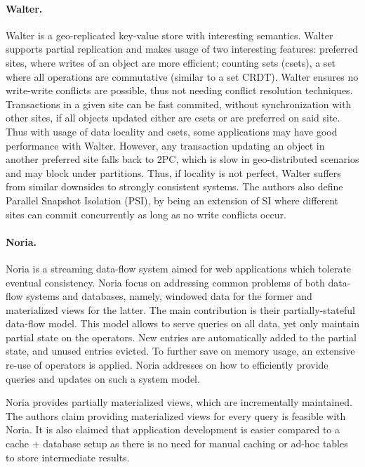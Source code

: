 \paragraph{Walter.} Walter \cite{walter} is a geo-replicated key-value store with interesting semantics.
Walter supports partial replication and makes usage of two interesting features: preferred sites, where writes of an object are more efficient; counting sets (csets), a set where all operations are commutative (similar to a set CRDT).
Walter ensures no write-write conflicts are possible, thus not needing conflict resolution techniques.
Transactions in a given site can be fast commited, without synchronization with other sites, if all objects updated either are csets or are preferred on said site.
Thus with usage of data locality and csets, some applications may have good performance with Walter.
However, any transaction updating an object in another preferred site falls back to 2PC, which is slow in geo-distributed scenarios and may block under partitions.
Thus, if locality is not perfect, Walter suffers from similar downsides to strongly consistent systems.
The authors also define Parallel Snapshot Isolation (PSI), by being an extension of SI where different sites can commit concurrently as long as no write conflicts occur.

\paragraph{Noria.} Noria \cite{noria} is a streaming data-flow system aimed for web applications which tolerate eventual consistency.
Noria focus on addressing common problems of both data-flow systems and databases, namely, windowed data for the former and materialized views for the latter.
The main contribution is their partially-stateful data-flow model.
This model allows to serve queries on all data, yet only maintain partial state on the operators.
New entries are automatically added to the partial state, and unused entries evicted.
To further save on memory usage, an extensive re-use of operators is applied.
Noria addresses on how to efficiently provide queries and updates on such a system model.

Noria provides partially materialized views, which are incrementally maintained.
The authors claim providing materialized views for every query is feasible with Noria. It is also claimed that application development is easier compared to a cache + database setup as there is no need for manual caching or ad-hoc tables to store intermediate results.

